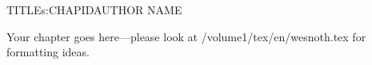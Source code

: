 \begin{aosachapter}{TITLE}{s:CHAPID}{AUTHOR NAME}

Your chapter goes here---please look at /volume1/tex/en/wesnoth.tex for 
formatting ideas.

\end{aosachapter}
